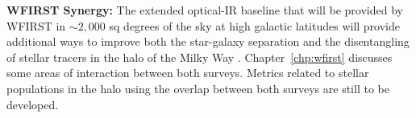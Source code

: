 \textbf{WFIRST Synergy:} The extended optical-IR baseline that will be
provided by WFIRST \citep{2015arXiv150303757S} in $\sim 2,000$ sq degrees of the sky at high galactic latitudes
will provide additional ways to improve both the star-galaxy separation \citep[e.g.][]{banerji15} and the disentangling of stellar tracers in the halo
of the Milky Way \citep[e.g.][]{dalcanton12}. Chapter~\ref{chp:wfirst} discusses some areas of interaction between both
surveys. Metrics related to stellar populations in the halo using the overlap between both surveys are 
still to be developed.

%
%
%
%
